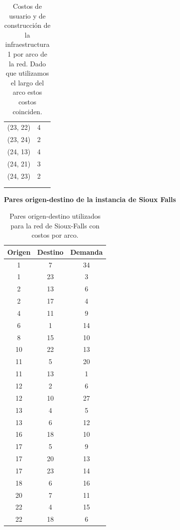 \documentclass{article}
\begin{document}
\begin{table}[h!]
\begin{tabular}{ccc}
        (23, 22) & 4 \\
        (23, 24) & 2 \\
        (24, 13) & 4 \\
        (24, 21) & 3 \\
        (24, 23) & 2 \\
         & \\
         & \\
      \bottomrule
    \end{tabular}
    \caption{Costos de usuario y de construcción de la infraestructura 1 por arco de la red. Dado que utilizamos el largo del arco estos costos coinciden.}\label{table:siouxfallsgraphdata}
  \end{table}

  \begin{table}[h!]
    \centering
    \caption*{{\bf Pares origen-destino de la instancia de Sioux Falls}}
    \begin{tabular}{ccc}
      \toprule
        Origen & Destino & Demanda \\
      \midrule
        1 & 7 & 34 \\
        1 & 23 & 3 \\
        2 & 13 & 6 \\
        2 & 17 & 4 \\
        4 & 11 & 9 \\
        6 & 1 & 14 \\
        8 & 15 & 10 \\
        10 & 22 & 13 \\
        11 & 5 & 20 \\
        11 & 13 & 1 \\
        12 & 2 & 6 \\
        12 & 10 & 27 \\
        13 & 4 & 5 \\
        13 & 6 & 12 \\
        16 & 18 & 10 \\
        17 & 5 & 9 \\
        17 & 20 & 13 \\
        17 & 23 & 14 \\
        18 & 6 & 16 \\
        20 & 7 & 11 \\
        22 & 4 & 15 \\
        22 & 18 & 6 \\
      \bottomrule
    \end{tabular}
    \caption{Pares origen-destino utilizados para la red de Sioux-Falls con costos por arco.}\label{table:siouxfallsdemanddata}
  \end{table}
\end{document}
